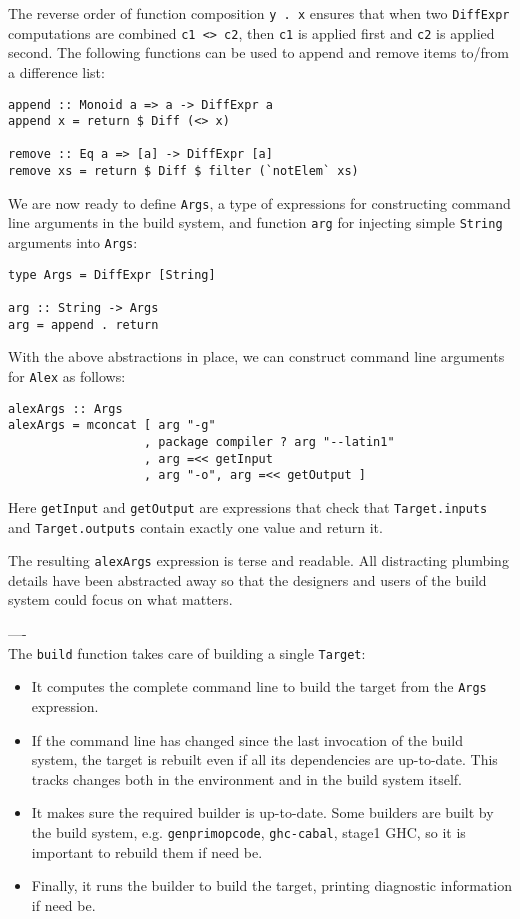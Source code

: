 The reverse order of function composition \texttt{y . x} ensures that when two
\texttt{DiffExpr} computations are combined \texttt{c1 <> c2}, then \texttt{c1}
is applied first and \texttt{c2} is applied second. The following functions
can be used to append and remove items to/from a difference list:

\begin{lstlisting}[basicstyle=\ttfamily]
append :: Monoid a => a -> DiffExpr a
append x = return $ Diff (<> x)

remove :: Eq a => [a] -> DiffExpr [a]
remove xs = return $ Diff $ filter (`notElem` xs)
\end{lstlisting}

We are now ready to define \texttt{Args}, a type of expressions for constructing
command line arguments in the build system, and function \texttt{arg} for
injecting simple \texttt{String} arguments into \texttt{Args}:

\begin{lstlisting}[basicstyle=\ttfamily]
type Args = DiffExpr [String]

arg :: String -> Args
arg = append . return
\end{lstlisting}

With the above abstractions in place, we can construct command line arguments
for \texttt{Alex} as follows:

\begin{lstlisting}[basicstyle=\ttfamily]
alexArgs :: Args
alexArgs = mconcat [ arg "-g"
                   , package compiler ? arg "--latin1" 
                   , arg =<< getInput
                   , arg "-o", arg =<< getOutput ]
\end{lstlisting}

Here \texttt{getInput} and \texttt{getOutput} are expressions that check that
\texttt{Target.inputs} and \texttt{Target.outputs} contain exactly one value and
return it.

The resulting \texttt{alexArgs} expression is terse and readable. All
distracting plumbing details have been abstracted away so that the
designers and users of the build system could focus on what matters.


\noindent ----\\
\noindent The \texttt{build} function takes care of building a single
\texttt{Target}:
\begin{itemize}
  \item It computes the complete command line to build the target from the
  \texttt{Args} expression.
  \item If the command line has changed since the last invocation of the build
  system, the target is rebuilt even if all its dependencies are up-to-date.
  This tracks changes both in the environment and in the build system itself.
  \item It makes sure the required builder is up-to-date. Some builders are
  built by the build system, e.g. \texttt{genprimopcode}, \texttt{ghc-cabal},
  stage1 GHC, so it is important to rebuild them if need be.
  \item Finally, it runs the builder to build the target, printing diagnostic
  information if need be.
\end{itemize}
